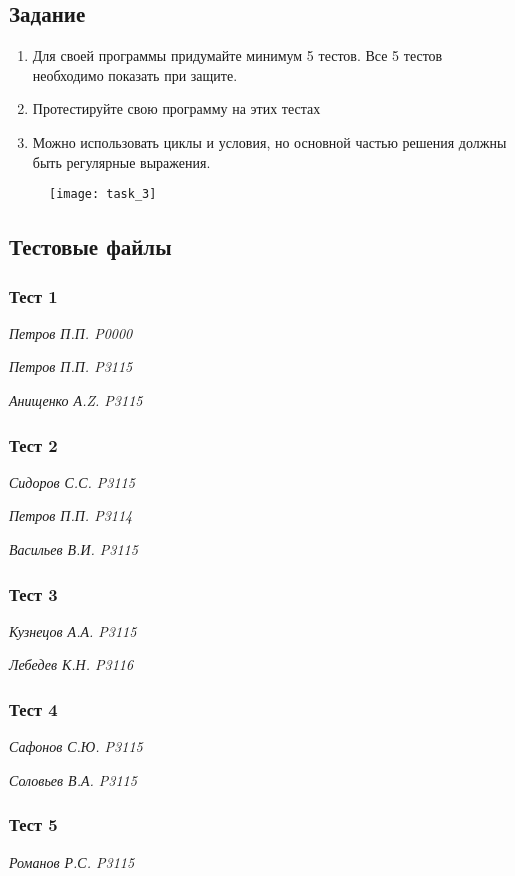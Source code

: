 \subsection*{Задание}

\begin{enumerate}
\item Для своей программы придумайте минимум 5 тестов. Все 5 тестов необходимо показать при защите.
\item Протестируйте свою программу на этих тестах
\item Можно использовать циклы и условия, но основной частью решения должны быть регулярные выражения.
\end{enumerate}

\begin{figure}[h]
	\centering
	\texttt{[image: task\_3]}
\end{figure}

\subsection*{Тестовые файлы}
\subsubsection*{Тест 1}
\textit{Петров П.П. P0000}

\textit{Петров П.П. P3115}

\textit{Анищенко А.Z. P3115}

\subsubsection*{Тест 2}
\textit{Сидоров С.С. P3115}

\textit{Петров П.П. P3114}

\textit{Васильев В.И. P3115}

\subsubsection*{Тест 3}
\textit{Кузнецов А.А. P3115}

\textit{Лебедев К.Н. P3116}

\subsubsection*{Тест 4}
\textit{Сафонов С.Ю. P3115}

\textit{Соловьев В.А. P3115}

\subsubsection*{Тест 5}
\textit{Романов Р.С. P3115}

